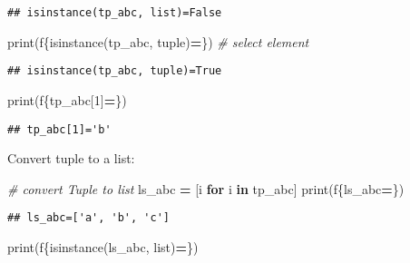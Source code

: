\documentclass[
]{book}
\newenvironment{Shaded}{\begin{snugshade}}{\end{snugshade}}
\newcommand{\BuiltInTok}[1]{#1}
\newcommand{\CommentTok}[1]{\textcolor[rgb]{0.56,0.35,0.01}{\textit{#1}}}
\newcommand{\ControlFlowTok}[1]{\textcolor[rgb]{0.13,0.29,0.53}{\textbf{#1}}}
\newcommand{\DecValTok}[1]{\textcolor[rgb]{0.00,0.00,0.81}{#1}}
\newcommand{\KeywordTok}[1]{\textcolor[rgb]{0.13,0.29,0.53}{\textbf{#1}}}
\newcommand{\NormalTok}[1]{#1}
\newcommand{\OperatorTok}[1]{\textcolor[rgb]{0.81,0.36,0.00}{\textbf{#1}}}
\newcommand{\SpecialCharTok}[1]{\textcolor[rgb]{0.00,0.00,0.00}{#1}}
\newcommand{\SpecialStringTok}[1]{\textcolor[rgb]{0.31,0.60,0.02}{#1}}
\begin{document}
\begin{verbatim}
## isinstance(tp_abc, list)=False
\end{verbatim}

\begin{Shaded}
\begin{Highlighting}[]
\BuiltInTok{print}\NormalTok{(}\SpecialStringTok{f\textquotesingle{}}\SpecialCharTok{\{}\BuiltInTok{isinstance}\NormalTok{(tp\_abc, }\BuiltInTok{tuple}\NormalTok{)}\OperatorTok{=}\SpecialCharTok{\}}\SpecialStringTok{\textquotesingle{}}\NormalTok{)}
\CommentTok{\# select element}
\end{Highlighting}
\end{Shaded}

\begin{verbatim}
## isinstance(tp_abc, tuple)=True
\end{verbatim}

\begin{Shaded}
\begin{Highlighting}[]
\BuiltInTok{print}\NormalTok{(}\SpecialStringTok{f\textquotesingle{}}\SpecialCharTok{\{}\NormalTok{tp\_abc[}\DecValTok{1}\NormalTok{]}\OperatorTok{=}\SpecialCharTok{\}}\SpecialStringTok{\textquotesingle{}}\NormalTok{)}
\end{Highlighting}
\end{Shaded}

\begin{verbatim}
## tp_abc[1]='b'
\end{verbatim}

Convert tuple to a list:

\begin{Shaded}
\begin{Highlighting}[]
\CommentTok{\# convert Tuple to list}
\NormalTok{ls\_abc }\OperatorTok{=}\NormalTok{ [i }\ControlFlowTok{for}\NormalTok{ i }\KeywordTok{in}\NormalTok{ tp\_abc]}
\BuiltInTok{print}\NormalTok{(}\SpecialStringTok{f\textquotesingle{}}\SpecialCharTok{\{}\NormalTok{ls\_abc}\OperatorTok{=}\SpecialCharTok{\}}\SpecialStringTok{\textquotesingle{}}\NormalTok{)}
\end{Highlighting}
\end{Shaded}

\begin{verbatim}
## ls_abc=['a', 'b', 'c']
\end{verbatim}

\begin{Shaded}
\begin{Highlighting}[]
\BuiltInTok{print}\NormalTok{(}\SpecialStringTok{f\textquotesingle{}}\SpecialCharTok{\{}\BuiltInTok{isinstance}\NormalTok{(ls\_abc, }\BuiltInTok{list}\NormalTok{)}\OperatorTok{=}\SpecialCharTok{\}}\SpecialStringTok{\textquotesingle{}}\NormalTok{)}
\end{Highlighting}
\end{Shaded}
\end{document}
